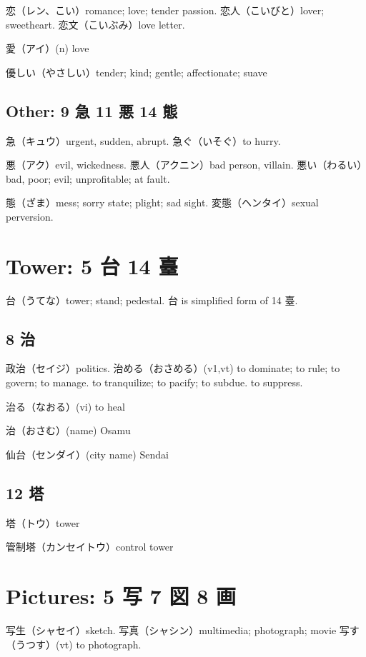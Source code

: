 恋（レン、こい）romance; love; tender passion.
恋人（こいびと）lover; sweetheart.
恋文（こいぶみ）love letter.

愛（アイ）(n) love

優しい（やさしい）tender; kind; gentle; affectionate; suave

\subsection{Other: 9 急 11 悪 14 態}

急（キュウ）urgent, sudden, abrupt.
急ぐ（いそぐ）to hurry.

悪（アク）evil, wickedness.
悪人（アクニン）bad person, villain.
悪い（わるい）bad, poor; evil; unprofitable; at fault.

態（ざま）mess; sorry state; plight; sad sight.
変態（ヘンタイ）sexual perversion.

\section{Tower: 5 台 14 臺}

台（うてな）tower; stand; pedestal.
台 is simplified form of 14 臺.

\subsection{8 治}

政治（セイジ）politics.
治める（おさめる）(v1,vt)
to dominate; to rule; to govern; to manage.
to tranquilize; to pacify; to subdue.
to suppress.

治る（なおる）(vi) to heal

治（おさむ）(name) Osamu

仙台（センダイ）(city name) Sendai

\subsection{12 塔}

塔（トウ）tower

管制塔（カンセイトウ）control tower

\section{Pictures: 5 写 7 図 8 画}

写生（シャセイ）sketch.
写真（シャシン）multimedia; photograph; movie
写す（うつす）(vt) to photograph.


